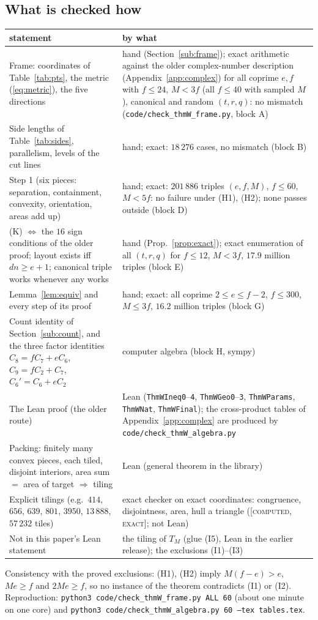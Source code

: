 \documentclass[11pt,reqno]{amsart}
\theoremstyle{plain}
\theoremstyle{definition}
\newcommand{\lab}[1]{\textup{[\textsc{#1}]}}
\newcommand{\CE}{\lab{computed, exact}}
\begin{document}
\subsection{What is checked how}\label{sub:checked}
\begin{center}\small
\begin{tabular}{@{}p{5.1cm}p{7.3cm}@{}}
\toprule
statement & by what\\
\midrule
Frame: coordinates of Table~\ref{tab:pts}, the metric (\ref{eq:metric}), the five directions & hand (Section~\ref{sub:frame}); exact arithmetic against the older complex-number description (Appendix~\ref{app:complex}) for all coprime $e,f$ with $f\le24$, $M<3f$ (all $f\le40$ with sampled $M$), canonical and random $(t,r,q)$: no mismatch (\texttt{code/check\_thmW\_frame.py}, block A)\\
Side lengths of Table~\ref{tab:sides}, parallelism, levels of the cut lines & hand; exact: $18\,276$ cases, no mismatch (block B)\\
Step 1 (six pieces: separation, containment, convexity, orientation, areas add up) & hand; exact: $201\,886$ triples $(e,f,M)$, $f\le60$, $M<5f$: no failure under (H1), (H2); none passes outside (block D)\\
(K) $\Leftrightarrow$ the $16$ sign conditions of the older proof; layout exists iff $dn\ge e+1$; canonical triple works whenever any works & hand (Prop.~\ref{prop:exact}); exact enumeration of all $(t,r,q)$ for $f\le12$, $M<3f$, $17.9$ million triples (block E)\\
Lemma~\ref{lem:equiv} and every step of its proof & hand; exact: all coprime $2\le e\le f-2$, $f\le300$, $M\le3f$, $16.2$ million triples (block G)\\
Count identity of Section~\ref{sub:count}, and the three factor identities $C_8=fC_7+eC_6$, $C_9=fC_2+C_7$, $C_6'=C_6+eC_2$ & computer algebra (block H, sympy)\\
The Lean proof (the older route) & Lean (\texttt{ThmWIneq0}--\texttt{4}, \texttt{ThmWGeo0}--\texttt{3}, \texttt{ThmWParams}, \texttt{ThmWNat}, \texttt{ThmWFinal}); the cross-product tables of Appendix~\ref{app:complex} are produced by \texttt{code/check\_thmW\_algebra.py}\\
Packing: finitely many convex pieces, each tiled, disjoint interiors, area sum $=$ area of target $\Rightarrow$ tiling & Lean (general theorem in the library)\\
Explicit tilings (e.g.\ $414$, $656$, $639$, $801$, $3950$, $13\,888$, $57\,232$ tiles) & exact checker on exact coordinates: congruence, disjointness, area, hull a triangle (\CE{}; not Lean)\\
Not in this paper's Lean statement & the tiling of $T_M$ (glue (I5), Lean in the earlier release); the exclusions (I1)--(I3)\\
\bottomrule
\end{tabular}
\end{center}
Consistency with the proved exclusions: (H1), (H2) imply $M(f-e)>e$, $Me\ge f$ and $2Me\ge f$, so no instance of the theorem contradicts (I1) or (I2).
Reproduction: \texttt{python3 code/check\_thmW\_frame.py ALL 60} (about one minute on one core) and \texttt{python3 code/check\_thmW\_algebra.py 60 --tex tables.tex}.
\end{document}
